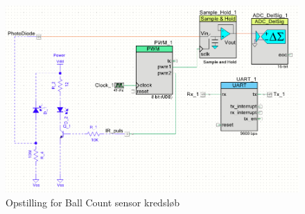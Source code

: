 \documentclass[HardwareDesign/HardwareDesign_main.tex]{subfiles}
\begin{document}
\begin{figure}
    \centering
    \includegraphics[width=1\textwidth]{HardwareDesign/Bolddispenser/graphics/Opstilling2.png}
    \caption{Opstilling for Ball Count sensor kredsløb}
    \label{fig:PSoC_TopDesign}
\end{figure}
\end{document}
